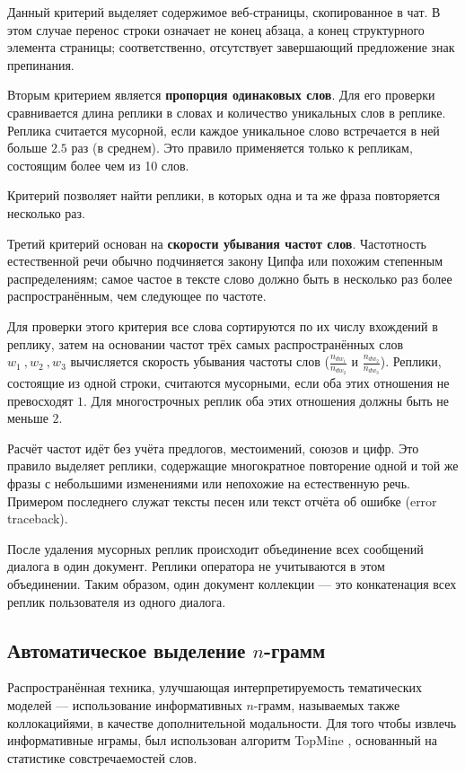 Данный критерий выделяет содержимое веб-страницы, скопированное в чат. В этом случае перенос строки означает не конец абзаца, а конец структурного элемента страницы; соответственно, отсутствует завершающий предложение знак препинания.

Вторым критерием является \textbf{пропорция одинаковых слов}. Для его проверки сравнивается длина реплики в словах и количество уникальных слов в реплике. Реплика считается мусорной, если каждое уникальное слово встречается в ней больше $2.5$ раз (в среднем). Это правило применяется только к репликам, состоящим более чем из 10 слов.

Критерий позволяет найти реплики, в которых одна и та же фраза повторяется несколько раз.

Третий критерий основан на \textbf{скорости убывания частот слов}. Частотность естественной речи обычно подчиняется закону Ципфа или похожим степенным распределениям; самое частое в тексте слово должно быть в несколько раз более распространённым, чем следующее по частоте.

Для проверки этого критерия все слова сортируются по их числу вхождений в реплику, затем на основании частот трёх самых распространённых слов $w_1~,w_2~,w_3$ вычисляется скорость убывания частоты слов ($\frac{n_{d{w_1}}}{n_{dw_2}}$ и $\frac{n_{d{w_2}}}{n_{dw_3}}$). Реплики, состоящие из одной строки, считаются мусорными, если оба этих отношения не превосходят $1$. Для многострочных реплик оба этих отношения должны быть не меньше $2$.

Расчёт частот идёт без учёта предлогов, местоимений, союзов и цифр. Это правило выделяет реплики, содержащие многократное повторение одной и той же фразы с небольшими изменениями или непохожие на естественную речь. Примером последнего служат тексты песен или текст отчёта об ошибке (error traceback).

После удаления мусорных реплик происходит объединение всех сообщений диалога в один документ. Реплики оператора не учитываются в этом объединении. Таким образом, один документ коллекции --- это конкатенация всех реплик пользователя из одного диалога.

\subsection{Автоматическое выделение $n$-грамм}

\par Распространённая техника, улучшающая интерпретируемость тематических моделей --- использование информативных $n$-грамм, называемых также коллокацийями, в качестве дополнительной модальности. Для того чтобы извлечь информативные нграмы, был использован алгоритм TopMine \cite{topmine}, основанный на статистике совстречаемостей слов.

